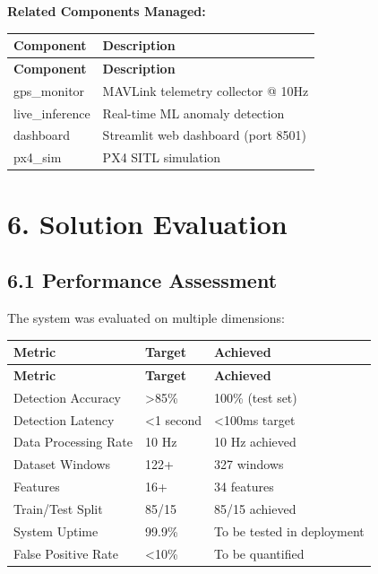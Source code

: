 \documentclass[12pt,a4paper]{article}
\begin{document}
\textbf{Related Components Managed:}
\begin{longtable}{|p{3.5cm}|p{11cm}|}
\hline
\textbf{Component} & \textbf{Description} \\
\hline
\endfirsthead
\hline
\textbf{Component} & \textbf{Description} \\
\hline
\endhead
\hline
gps\_monitor & MAVLink telemetry collector @ 10Hz \\
\hline
live\_inference & Real-time ML anomaly detection \\
\hline
dashboard & Streamlit web dashboard (port 8501) \\
\hline
px4\_sim & PX4 SITL simulation \\
\hline
\end{longtable}

\newpage

\section{6. Solution Evaluation}

\subsection{6.1 Performance Assessment}

The system was evaluated on multiple dimensions:

\begin{longtable}{|p{4cm}|p{5cm}|p{6cm}|}
\hline
\textbf{Metric} & \textbf{Target} & \textbf{Achieved} \\
\hline
\endfirsthead
\hline
\textbf{Metric} & \textbf{Target} & \textbf{Achieved} \\
\hline
\endhead
\hline
Detection Accuracy & >85\% & 100\% (test set) \\
\hline
Detection Latency & <1 second & <100ms target \\
\hline
Data Processing Rate & 10 Hz & 10 Hz achieved \\
\hline
Dataset Windows & 122+ & 327 windows \\
\hline
Features & 16+ & 34 features \\
\hline
Train/Test Split & 85/15 & 85/15 achieved \\
\hline
System Uptime & 99.9\% & To be tested in deployment \\
\hline
False Positive Rate & <10\% & To be quantified \\
\hline
\end{longtable}
\end{document}
